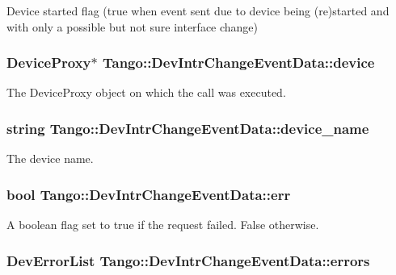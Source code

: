 Device started flag (true when event sent due to device being (re)started and with only a possible but not sure interface change) 

\subsubsection[{device}]{\setlength{\rightskip}{0pt plus 5cm}Device\-Proxy$\ast$ Tango\-::\-Dev\-Intr\-Change\-Event\-Data\-::device}\label{classTango_1_1DevIntrChangeEventData_aa23d2843deae51a30852fb1d49d51c91}


The Device\-Proxy object on which the call was executed. 

\subsubsection[{device\-\_\-name}]{\setlength{\rightskip}{0pt plus 5cm}string Tango\-::\-Dev\-Intr\-Change\-Event\-Data\-::device\-\_\-name}\label{classTango_1_1DevIntrChangeEventData_acc8d3960c808ddbcd750224ba1d9f417}


The device name. 

\subsubsection[{err}]{\setlength{\rightskip}{0pt plus 5cm}bool Tango\-::\-Dev\-Intr\-Change\-Event\-Data\-::err}\label{classTango_1_1DevIntrChangeEventData_a52384944b2b92cbd9ecf66b21c4a9fdc}


A boolean flag set to true if the request failed. False otherwise. 

\subsubsection[{errors}]{\setlength{\rightskip}{0pt plus 5cm}Dev\-Error\-List Tango\-::\-Dev\-Intr\-Change\-Event\-Data\-::errors}\label{classTango_1_1DevIntrChangeEventData_a33be40ed8e49d251e5ba18e87a6468ef}



